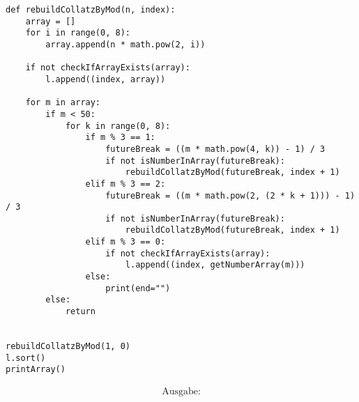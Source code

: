 \documentclass{article}
\begin{document}
\newpage
\begin{verbatim}
def rebuildCollatzByMod(n, index):
    array = []
    for i in range(0, 8):
        array.append(n * math.pow(2, i))

    if not checkIfArrayExists(array):
        l.append((index, array))

    for m in array:
        if m < 50:
            for k in range(0, 8):
                if m % 3 == 1:
                    futureBreak = ((m * math.pow(4, k)) - 1) / 3
                    if not isNumberInArray(futureBreak):
                        rebuildCollatzByMod(futureBreak, index + 1)
                elif m % 3 == 2:
                    futureBreak = ((m * math.pow(2, (2 * k + 1))) - 1) / 3
                    if not isNumberInArray(futureBreak):
                        rebuildCollatzByMod(futureBreak, index + 1)
                elif m % 3 == 0:
                    if not checkIfArrayExists(array):
                        l.append((index, getNumberArray(m)))
                else:
                    print(end="")
        else:
            return


rebuildCollatzByMod(1, 0)
l.sort()
printArray()
\end{verbatim}
\newpage
\begin{gather*}
\text {Ausgabe:}
\end{gather*}
\end{document}
